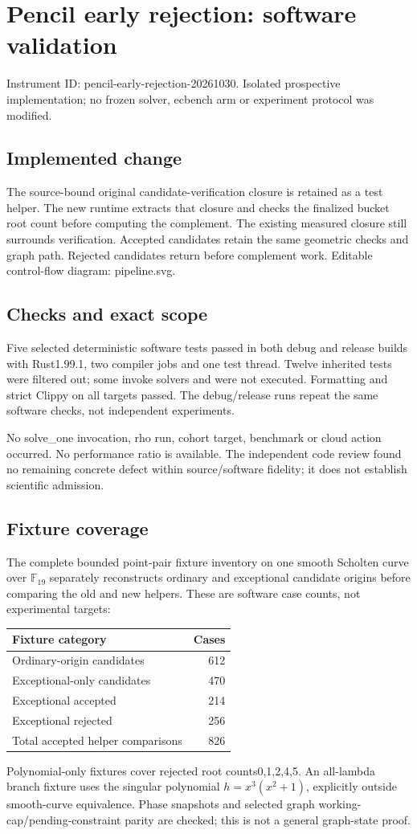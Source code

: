 \documentclass[11pt]{article}
\begin{document}
\section*{Pencil early rejection: software validation}
Instrument ID: pencil-early-rejection-20261030. Isolated prospective implementation; no frozen solver, ecbench arm or experiment protocol was modified.
\subsection*{Implemented change}
The source-bound original candidate-verification closure is retained as a test helper. The new runtime extracts that closure and checks the finalized bucket root count before computing the complement. The existing measured closure still surrounds verification. Accepted candidates retain the same geometric checks and graph path. Rejected candidates return before complement work. Editable control-flow diagram: pipeline.svg.
\subsection*{Checks and exact scope}
Five selected deterministic software tests passed in both debug and release builds with Rust1.99.1, two compiler jobs and one test thread. Twelve inherited tests were filtered out; some invoke solvers and were not executed. Formatting and strict Clippy on all targets passed. The debug/release runs repeat the same software checks, not independent experiments.\par
No solve\_one invocation, rho run, cohort target, benchmark or cloud action occurred. No performance ratio is available. The independent code review found no remaining concrete defect within source/software fidelity; it does not establish scientific admission.
\subsection*{Fixture coverage}
The complete bounded point-pair fixture inventory on one smooth Scholten curve over $\mathbb F_{19}$ separately reconstructs ordinary and exceptional candidate origins before comparing the old and new helpers. These are software case counts, not experimental targets:
\begin{center}\begin{tabular}{lr}\toprule
Fixture category&Cases\\\midrule
Ordinary-origin candidates&612\\
Exceptional-only candidates&470\\
Exceptional accepted&214\\
Exceptional rejected&256\\
Total accepted helper comparisons&826\\\bottomrule\end{tabular}\end{center}
Polynomial-only fixtures cover rejected root counts0,1,2,4,5. An all-lambda branch fixture uses the singular polynomial $h=x^3(x^2+1)$, explicitly outside smooth-curve equivalence. Phase snapshots and selected graph working-cap/pending-constraint parity are checked; this is not a general graph-state proof.
\end{document}
